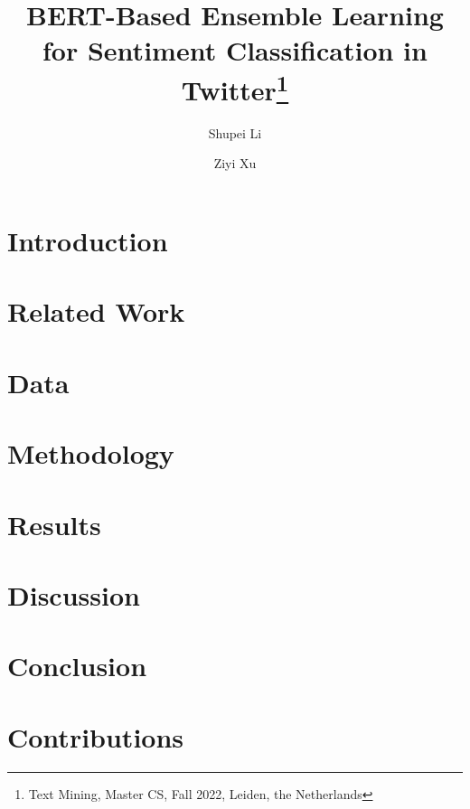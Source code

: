 \documentclass[runningheads]{llncs}
\begin{document}
%
\title{BERT-Based Ensemble Learning for Sentiment Classification in Twitter\thanks{Text Mining, Master CS, Fall 2022, Leiden, the Netherlands}}
%
%
\author{Shupei Li\and
Ziyi Xu}
%
%
%
\maketitle              %
%
\begin{abstract}

\end{abstract}
%
%
%
\section{Introduction}

\section{Related Work}

\section{Data}

\section{Methodology}
    
\section{Results}
    
\section{Discussion}
    
\section{Conclusion}
    
\section{Contributions}

%
%


%
\end{document}
